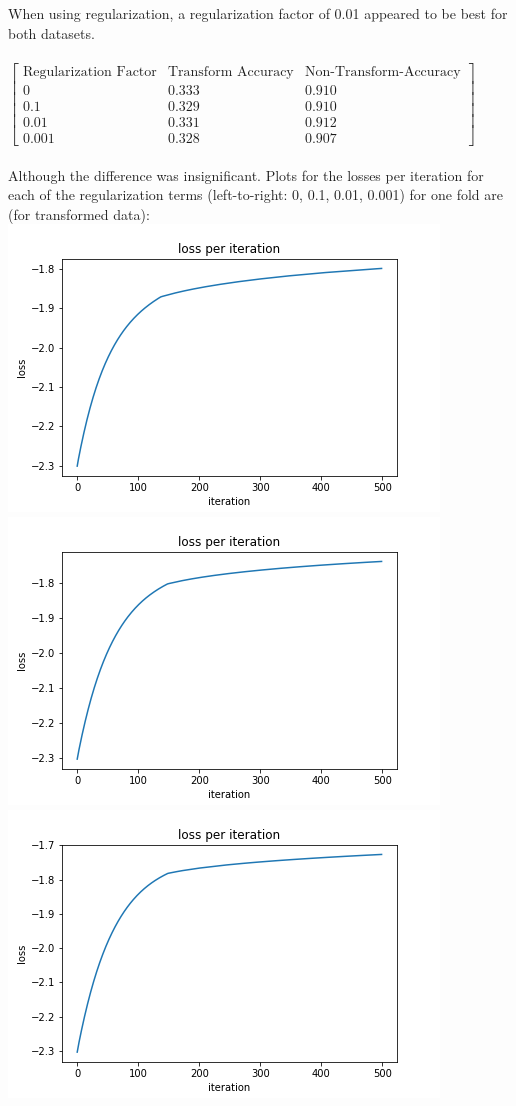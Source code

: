 \documentclass[11pt]{article}
\begin{document}
When using regularization, a regularization factor of 0.01 appeared to be best for both datasets.\\
 \\
 $
 \begin{bmatrix}
 	\text{Regularization Factor} & \text{Transform Accuracy} & \text{Non-Transform-Accuracy}\\
 	0 & 0.333 & 0.910 \\
 	0.1 & 0.329 & 0.910\\
 	0.01 & 0.331 & 0.912\\
 	0.001 & 0.328 & 0.907
 \end{bmatrix}
 $\\
 \\
Although the difference was insignificant. Plots for the losses per iteration for each of the regularization terms (left-to-right: 0, 0.1, 0.01, 0.001) for one fold are (for transformed data):\\
\includegraphics[scale=0.2]{images/loss_transform_0000}
\includegraphics[scale=0.2]{images/loss_transform_0001}
\includegraphics[scale=0.2]{images/loss_transform_0002}
\end{document}

